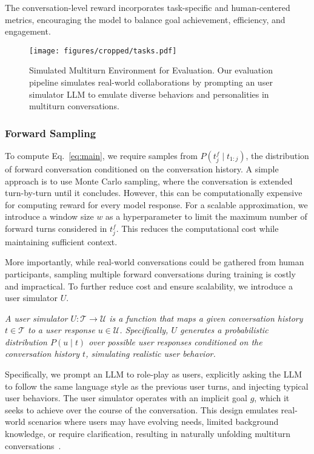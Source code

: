 The conversation-level reward incorporates task-specific and human-centered metrics, encouraging the model to balance goal achievement, efficiency, and engagement.
\begin{figure*}[t]
    \centering
    \texttt{[image: figures/cropped/tasks.pdf]}
    \vspace{-15pt}
    \caption{Simulated Multiturn Environment for Evaluation. Our evaluation pipeline simulates real-world collaborations by prompting an user simulator LLM to emulate diverse behaviors and personalities in multiturn conversations. 
    }
    \label{fig:evaluation}
\end{figure*}


\subsubsection{Forward Sampling}
\label{sec:sample}

To compute Eq.~\ref{eq:main}, we require samples from $P(t_j^f \mid t_{1:j})$, the distribution of forward conversation conditioned on the conversation history. 
A simple approach is to use Monte Carlo sampling, where the conversation is extended turn-by-turn until it concludes.  
However, this can be computationally expensive for computing reward for every model response.
For a scalable approximation, we introduce a window size $w$ as a hyperparameter to limit the maximum number of forward turns considered in $t_j^f$. This reduces the computational cost while maintaining sufficient context. 

More importantly, while real-world conversations could be gathered from human participants, sampling multiple forward conversations during training is costly and impractical. To further reduce cost and ensure scalability, we introduce a user simulator $U$.

\textit{A user simulator $U: \mathcal{T} \rightarrow \mathcal{U}$ is a function that maps a given conversation history $t \in \mathcal{T}$ to a user response $u \in \mathcal{U}$. Specifically, $U$ generates a probabilistic distribution $P(u \mid t)$ over possible user responses conditioned on the conversation history $t$, simulating realistic user behavior. }

Specifically, we prompt an LLM to role-play as users,  explicitly asking the LLM to follow the same language style as the previous user turns, and injecting typical user behaviors. The user simulator operates with an implicit goal $g$, which it seeks to achieve over the course of the conversation. This design emulates real-world scenarios where users may have evolving needs, limited background knowledge, or require clarification, resulting in naturally unfolding multiturn conversations~\citep{simulate1000}.

